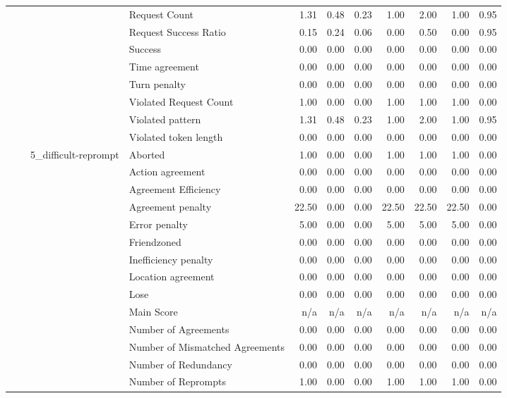 \begin{tabular}{llllrrrrrrr}
 &  &  & Request Count & 1.31 & 0.48 & 0.23 & 1.00 & 2.00 & 1.00 & 0.95 \\
 &  &  & Request Success Ratio & 0.15 & 0.24 & 0.06 & 0.00 & 0.50 & 0.00 & 0.95 \\
 &  &  & Success & 0.00 & 0.00 & 0.00 & 0.00 & 0.00 & 0.00 & 0.00 \\
 &  &  & Time agreement & 0.00 & 0.00 & 0.00 & 0.00 & 0.00 & 0.00 & 0.00 \\
 &  &  & Turn penalty & 0.00 & 0.00 & 0.00 & 0.00 & 0.00 & 0.00 & 0.00 \\
 &  &  & Violated Request Count & 1.00 & 0.00 & 0.00 & 1.00 & 1.00 & 1.00 & 0.00 \\
 &  &  & Violated pattern & 1.31 & 0.48 & 0.23 & 1.00 & 2.00 & 1.00 & 0.95 \\
 &  &  & Violated token length & 0.00 & 0.00 & 0.00 & 0.00 & 0.00 & 0.00 & 0.00 \\
\cline{3-11}
 &  & \multirow[t]{27}{*}{5_difficult-reprompt} & Aborted & 1.00 & 0.00 & 0.00 & 1.00 & 1.00 & 1.00 & 0.00 \\
 &  &  & Action agreement & 0.00 & 0.00 & 0.00 & 0.00 & 0.00 & 0.00 & 0.00 \\
 &  &  & Agreement Efficiency & 0.00 & 0.00 & 0.00 & 0.00 & 0.00 & 0.00 & 0.00 \\
 &  &  & Agreement penalty & 22.50 & 0.00 & 0.00 & 22.50 & 22.50 & 22.50 & 0.00 \\
 &  &  & Error penalty & 5.00 & 0.00 & 0.00 & 5.00 & 5.00 & 5.00 & 0.00 \\
 &  &  & Friendzoned & 0.00 & 0.00 & 0.00 & 0.00 & 0.00 & 0.00 & 0.00 \\
 &  &  & Inefficiency penalty & 0.00 & 0.00 & 0.00 & 0.00 & 0.00 & 0.00 & 0.00 \\
 &  &  & Location agreement & 0.00 & 0.00 & 0.00 & 0.00 & 0.00 & 0.00 & 0.00 \\
 &  &  & Lose & 0.00 & 0.00 & 0.00 & 0.00 & 0.00 & 0.00 & 0.00 \\
 &  &  & Main Score & n/a & n/a & n/a & n/a & n/a & n/a & n/a \\
 &  &  & Number of Agreements & 0.00 & 0.00 & 0.00 & 0.00 & 0.00 & 0.00 & 0.00 \\
 &  &  & Number of Mismatched Agreements & 0.00 & 0.00 & 0.00 & 0.00 & 0.00 & 0.00 & 0.00 \\
 &  &  & Number of Redundancy & 0.00 & 0.00 & 0.00 & 0.00 & 0.00 & 0.00 & 0.00 \\
 &  &  & Number of Reprompts & 1.00 & 0.00 & 0.00 & 1.00 & 1.00 & 1.00 & 0.00 \\

\end{tabular}
